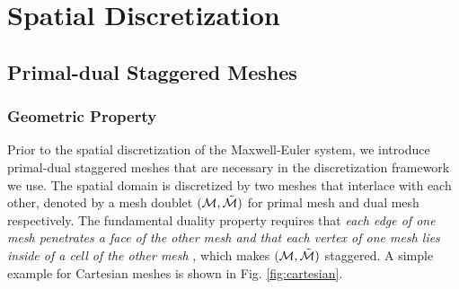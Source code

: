 \documentclass{article}
\begin{document}

\section{Spatial Discretization} \label{sec:spatial_discretization}
\subsection{Primal-dual Staggered Meshes} \label{sec:mesh-duality}
\subsubsection{Geometric Property}
Prior to the spatial discretization of the Maxwell-Euler system, we introduce primal-dual staggered meshes that are necessary in the discretization framework we use. The spatial domain is discretized by two meshes that interlace with each other, denoted by a mesh doublet $(\mathcal{M}, \Tilde{\mathcal{M}})$ for primal mesh and dual mesh respectively. The fundamental duality property requires that \emph{each edge of one mesh penetrates a face of the other mesh and that each vertex of one mesh lies inside of a cell of the other mesh} \citep{weiland_2003}, which makes $(\mathcal{M}, \Tilde{\mathcal{M}})$ staggered. A simple example for Cartesian meshes is shown in Fig. \ref{fig:cartesian}.
\end{document}
